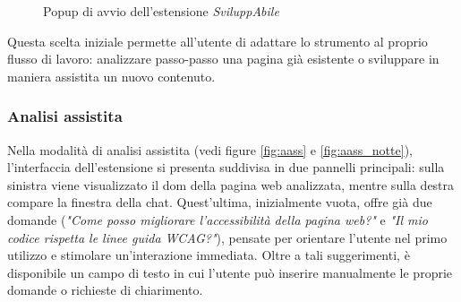 \begin{figure}[H]
    \centering
    \caption{Popup di avvio dell'estensione \textit{SviluppAbile}}\label{fig:popup}
\end{figure}

\noindent Questa scelta iniziale permette all’utente di adattare lo strumento al proprio flusso di lavoro: analizzare passo-passo una pagina già esistente o sviluppare in maniera assistita un nuovo contenuto.

\subsubsection{Analisi assistita}
\noindent Nella modalità di analisi assistita (vedi figure \ref{fig:aass} e \ref{fig:aass_notte}), l’interfaccia dell’estensione si presenta suddivisa in due pannelli principali: sulla sinistra viene visualizzato il \acrshort{dom} della pagina web analizzata, mentre sulla destra compare la finestra della chat. Quest’ultima, inizialmente vuota, offre già due domande (\textit{"Come posso migliorare l'accessibilità della pagina web?"} e \textit{"Il mio codice rispetta le linee guida WCAG?"}), pensate per orientare l’utente nel primo utilizzo e stimolare un’interazione immediata. Oltre a tali suggerimenti, è disponibile un campo di testo in cui l’utente può inserire manualmente le proprie domande o richieste di chiarimento.\\

